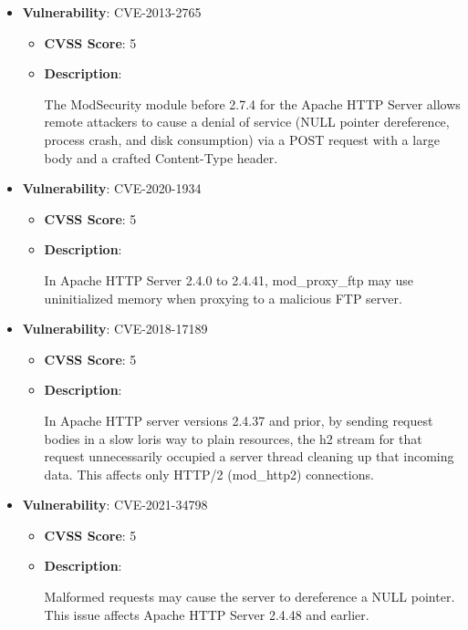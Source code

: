 \documentclass{article}
\begin{document}
\begin{itemize}
        \item \textbf{Vulnerability}: CVE-2013-2765
        \begin{itemize}
            \item \textbf{CVSS Score}:  5 
            \item \textbf{Description}:
            \parbox[t]{0.9\linewidth}{
                \ttfamily The ModSecurity module before 2.7.4 for the Apache HTTP Server allows remote attackers to cause a denial of service (NULL pointer dereference, process crash, and disk consumption) via a POST request with a large body and a crafted Content-Type header.
            }
        \end{itemize}
    
        \item \textbf{Vulnerability}: CVE-2020-1934
        \begin{itemize}
            \item \textbf{CVSS Score}:  5 
            \item \textbf{Description}:
            \parbox[t]{0.9\linewidth}{
                \ttfamily In Apache HTTP Server 2.4.0 to 2.4.41, mod\_proxy\_ftp may use uninitialized memory when proxying to a malicious FTP server.
            }
        \end{itemize}
    
        \item \textbf{Vulnerability}: CVE-2018-17189
        \begin{itemize}
            \item \textbf{CVSS Score}:  5 
            \item \textbf{Description}:
            \parbox[t]{0.9\linewidth}{
                \ttfamily In Apache HTTP server versions 2.4.37 and prior, by sending request bodies in a slow loris way to plain resources, the h2 stream for that request unnecessarily occupied a server thread cleaning up that incoming data. This affects only HTTP/2 (mod\_http2) connections.
            }
        \end{itemize}
    
        \item \textbf{Vulnerability}: CVE-2021-34798
        \begin{itemize}
            \item \textbf{CVSS Score}:  5 
            \item \textbf{Description}:
            \parbox[t]{0.9\linewidth}{
                \ttfamily Malformed requests may cause the server to dereference a NULL pointer. This issue affects Apache HTTP Server 2.4.48 and earlier.
            }
        \end{itemize}
    

\end{itemize}
\end{document}
